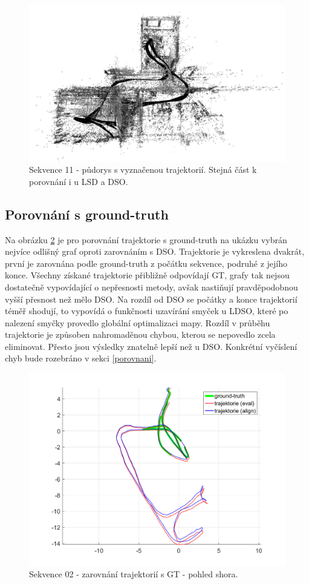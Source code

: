 \documentclass[12pt,a4paper]{report}
\begin{document}
\begin{figure}[H]
\centering
\includegraphics[width=1\textwidth]{img/LDSO_11_top_b.png}
\caption{Sekvence 11 - půdorys s vyznačenou trajektorií. Stejná část k porovnání i u LSD a DSO.}
\label{31}
\end{figure}

\subsection*{Porovnání s ground-truth}
Na obrázku \ref{32} je pro porovnání trajektorie s ground-truth na ukázku vybrán nejvíce odlišný graf oproti zarovnáním s DSO. Trajektorie je vykreslena dvakrát, první je zarovnána podle ground-truth z počátku sekvence, podruhé z jejího konce. Všechny získané trajektorie přibližně odpovídají  GT, grafy tak nejsou dostatečně vypovídající o nepřesnosti metody, avšak nastiňují pravděpodobnou vyšší přesnost než mělo DSO. Na rozdíl od DSO se počátky a konce trajektorií téměř shodují, to vypovídá o funkčnosti uzavírání smyček u LDSO, které po nalezení smyčky provedlo globální optimalizaci mapy. Rozdíl v průběhu trajektorie je způsoben nahromaděnou chybou, kterou se nepovedlo zcela eliminovat. Přesto jsou výsledky znatelně lepší než u DSO. Konkrétní vyčíslení chyb bude rozebráno v sekci \ref{porovnani}.


\begin{figure}[H]
\centering
\includegraphics[width=1\textwidth]{img/m_ldso_02_2.png}
\caption{Sekvence 02 - zarovnání trajektorií s GT - pohled shora.}
\label{32}
\end{figure}
\end{document}
